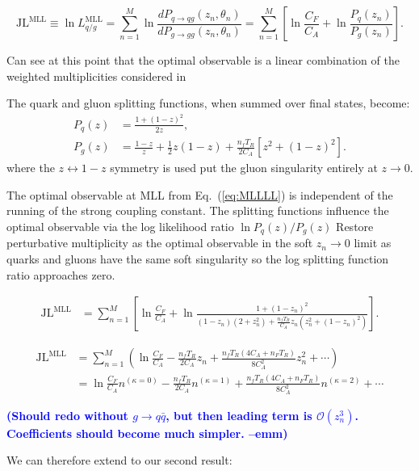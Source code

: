 \documentclass[letterpaper,11pt]{article}
\DeclareRobustCommand{\Eq}[1]{Eq.~(\ref{#1})}
\newcommand{\emm}[1]{\marginpar{\raggedright\scriptsize\textbf{\textcolor{blue}{emm}}}  \textbf{\textcolor{blue}{(#1 --emm)}}}
\begin{document}
\clearpage

\begin{equation}
\label{eq:MLLLL}
\text{JL}^\text{MLL} \equiv \ln L_{q/g}^\text{MLL} = \sum_{n=1}^M \ln \frac{dP_{q\to qg}(z_n,\theta_n)}{dP_{g\to gg}(z_n,\theta_n)} = \sum_{n=1}^M\left[\ln \frac{C_F}{C_A} + \ln \frac{P_q(z_n)}{P_g(z_n)} \right].
\end{equation}

Can see at this point that the optimal observable is a linear combination of the weighted multiplicities considered in 

The quark and gluon splitting functions, when summed over final states, become:
\begin{align}
P_q(z) & = \frac{1 + (1 - z)^2}{2z},\\
P_g(z) & = \frac{1 - z}{z} + \frac12 z(1-z) + \frac{n_f T_R}{2C_A}[z^2 + (1-z)^2].
\end{align}
where the $z\leftrightarrow 1-z$ symmetry is used put the gluon singularity entirely at $z\to 0$.


The optimal observable at MLL from \Eq{eq:MLLLL} is independent of the running of the strong coupling constant.
%
The splitting functions influence the optimal observable via the log likelihood ratio $\ln P_q(z)/P_g(z)$
%
Restore perturbative multiplicity as the optimal observable in the soft $z_n\to 0$ limit as quarks and gluons have the same soft singularity so the log splitting function ratio approaches zero.

\begin{align}
\label{eq:optobsMLL}
\text{JL}^\text{MLL} & = \sum_{n=1}^M\left[\ln \frac{C_F}{C_A} + \ln \frac{1+(1-z_n)^2}{(1-z_n)(2 + z_n^2) + \frac{n_f T_R}{C_A}z_n(z_n^2 + (1-z_n)^2)} \right].
\end{align}

\begin{align}
\text{JL}^\text{MLL} &= \sum_{n=1}^{M}\left(\ln \frac{C_F}{C_A} - \frac{n_f T_R}{2C_A} z_n + \frac{n_f T_R (4 C_A + n_F T_R)}{8 C_A^2} z_n^2 + \cdots \right)
\\& = \ln \frac{C_F}{C_A} n^{(\kappa = 0 )} - \frac{n_f T_R}{2C_A} n^{(\kappa = 1)} + \frac{n_f T_R (4 C_A + n_F T_R)}{8 C_A^2} n^{(\kappa = 2)} + \cdots
\end{align}

\emm{Should redo without $g\to q\bar q$, but then leading term is $\mathcal O(z_n^3)$. Coefficients should become much simpler.}

We can therefore extend to our second result:
\end{document}
